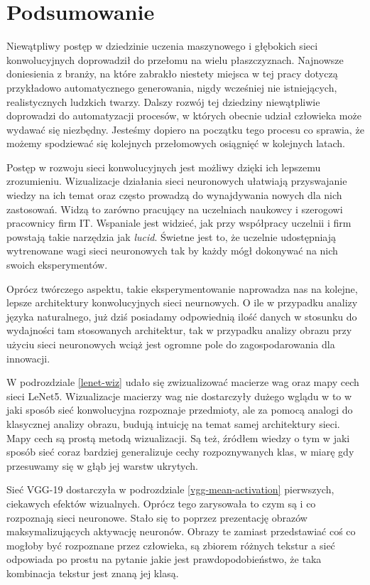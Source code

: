 \chapter{Podsumowanie}
\label{chap:summary}

Niewątpliwy postęp w dziedzinie uczenia maszynowego i głębokich sieci konwolucyjnych doprowadził do przełomu na wielu płaszczyznach. Najnowsze doniesienia z branży, na które zabrakło niestety miejsca w tej pracy dotyczą przykładowo automatycznego generowania, nigdy wcześniej nie istniejących, realistycznych ludzkich twarzy.
Dalszy rozwój tej dziedziny niewątpliwie doprowadzi do automatyzacji procesów, w których obecnie udział człowieka może wydawać się niezbędny. Jesteśmy dopiero na początku tego procesu co sprawia, że możemy spodziewać się kolejnych przełomowych osiągnięć w kolejnych latach.

Postęp w rozwoju sieci konwolucyjnych jest możliwy dzięki ich lepszemu zrozumieniu. Wizualizacje działania sieci neuronowych ułatwiają przyswajanie wiedzy na ich temat oraz często prowadzą do wynajdywania nowych dla nich zastosowań. Widzą to zarówno pracujący na uczelniach naukowcy i szerogowi pracownicy firm IT. Wspaniale jest widzieć, jak przy współpracy uczelnii i firm powstają takie narzędzia jak \textit{lucid}. Świetne jest to, że uczelnie udostępniają wytrenowane
wagi sieci neuronowych tak by każdy mógł dokonywać na nich swoich eksperymentów.

Oprócz twórczego aspektu, takie eksperymentowanie naprowadza nas na kolejne, lepsze architektury konwolucyjnych sieci neurnowych. O ile w przypadku analizy języka naturalnego, już dziś posiadamy odpowiednią ilość danych w stosunku do wydajności tam stosowanych architektur, tak w przypadku analizy obrazu przy użyciu sieci neuronowych wciąż jest ogromne pole do zagospodarowania dla innowacji.

W podrozdziale \ref{lenet-wiz} udało się zwizualizować macierze wag oraz mapy cech sieci LeNet5. Wizualizacje macierzy wag nie dostarczyły dużego wglądu w to w jaki sposób sieć konwolucyjna rozpoznaje przedmioty, ale za pomocą analogi do klasycznej analizy obrazu, budują intuicję na temat samej architektury sieci. Mapy cech są prostą metodą wizualizacji. Są też, źródłem wiedzy o tym w jaki sposób sieć coraz bardziej generalizuje cechy rozpoznywanych klas, w miarę gdy przesuwamy się
w głąb jej warstw ukrytych.  

Sieć VGG-19 dostarczyła w podrozdziale \ref{vgg-mean-activation} pierwszych, ciekawych efektów wizualnych. Oprócz tego zarysowała to czym są i co rozpoznają sieci neuronowe. Stało się to poprzez prezentację obrazów maksymalizujących aktywację neuronów. Obrazy te zamiast przedstawiać coś co mogłoby być rozpoznane przez człowieka, są zbiorem różnych tekstur a sieć odpowiada po prostu na pytanie jakie jest prawdopodobieństwo, że taka kombinacja tekstur jest znaną jej klasą.

